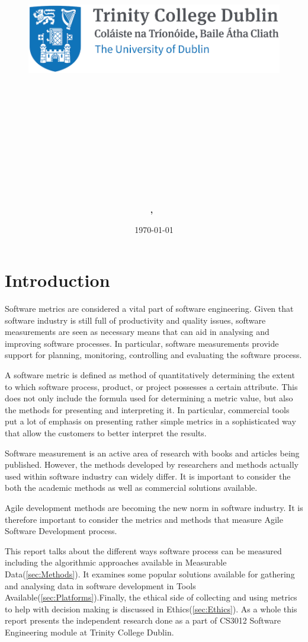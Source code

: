 \documentclass[11pt]{article}
\title{
\vspace{-1in}
\begin{figure}[!ht]
\flushleft
\includegraphics[width=0.4\linewidth]{reduced-trinity.png}
\end{figure}
\vspace{-0.5cm}
\hrulefill \\
\vspace{0.5cm}
\textmd{\textbf{\moduleCode\ \moduleName}}\\
\textmd{\textbf{\assignmentTitle}}\\
\vspace{0.5cm}
\hrulefill \\
}
\author{\textbf{\authorName,\ \authorID}}
\date{\today}
\begin{document}
\lstset{language=Java, captionpos=b, frame=single}
\captionsetup{width=.8\linewidth} 

\maketitle
\tableofcontents
\vspace{0.5in}

\section{Introduction}
\label{sec:Intro}

Software metrics are considered a vital part of software engineering.\cite{ieee-measurement-programs} Given that software industry is still full of productivity and quality issues, software measurements are seen as necessary means that can aid in analysing and improving software processes. In particular, software measurements provide support for planning, monitoring, controlling and evaluating the software process.\cite{Briand:2002:OPG:630832.631301} 

A software metric is defined as method of quantitatively determining the extent to which software process, product, or project possesses a certain attribute. This does not only include the formula used for determining a metric value, but also the methods for presenting and interpreting it.\cite{Daskalantonakis:1992:PVS:141344.141353} In particular, commercial tools put a lot of emphasis on presenting rather simple metrics in a sophisticated way that allow the customers to better interpret the results.

Software measurement is an active area of research with books and articles being published. However, the methods developed by researchers and methods actually used within software industry can widely differ. It is important to consider the both the academic methods as well as commercial solutions available.

Agile development methods are becoming the new norm in software industry.\cite{TARHAN2014477}\cite{hp-agile-report} It is therefore important to consider the metrics and methods that measure Agile Software Development process.

This report talks about the different ways software process can be measured including the algorithmic approaches available in Measurable Data(\ref{sec:Methods}). It examines some popular solutions available for gathering and analysing data in software development in Tools Available(\ref{sec:Platforms}).Finally, the ethical side of collecting and using metrics to help with decision making is discussed in Ethics(\ref{sec:Ethics}). 
As a whole this report presents the independent research done as a part of CS3012 Software Engineering module at Trinity College Dublin.
\end{document}
